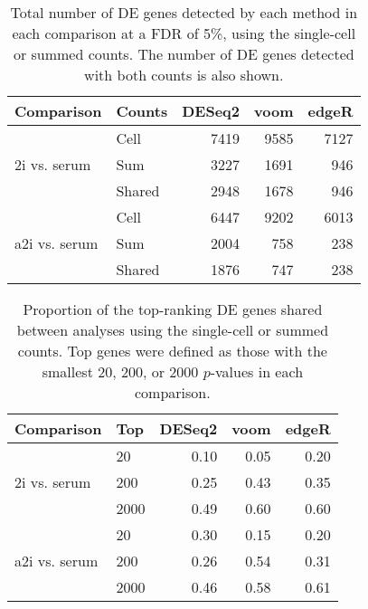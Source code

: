 \documentclass[oupdraft]{bio}
\begin{document}
\begin{table}[!p]
\caption{Total number of DE genes detected by each method in each comparison at a FDR of 5\%, using the single-cell or summed counts.
The number of DE genes detected with both counts is also shown.
}
\label{tab:realnum}
\begin{center}
\begin{tabular}{l l r r r}
\hline
\textbf{Comparison} & \textbf{Counts} & \textbf{DESeq2} & \textbf{voom} & \textbf{edgeR} \\
\hline
\multirow{3}{*}{2i vs. serum} 
& Cell & 7419 & 9585 & 7127 \\
& Sum & 3227 & 1691 & 946 \\
& Shared & 2948 & 1678 & 946 \\
\hline
\multirow{3}{*}{a2i vs. serum} 
& Cell & 6447 & 9202 & 6013 \\
& Sum & 2004 & 758 & 238 \\
& Shared & 1876 & 747 & 238 \\
\hline
\end{tabular}
\end{center}
\end{table}

\begin{table}[!p]
\caption{Proportion of the top-ranking DE genes shared between analyses using the single-cell or summed counts.
Top genes were defined as those with the smallest 20, 200, or 2000 $p$-values in each comparison.
}
\label{tab:realrank}
\begin{center}
\begin{tabular}{l l r r r}
\hline
\textbf{Comparison} & \textbf{Top} & \textbf{DESeq2} & \textbf{voom} & \textbf{edgeR} \\
\hline
\multirow{3}{*}{2i vs. serum} 
& 20 & 0.10 & 0.05 & 0.20 \\
& 200 & 0.25 & 0.43 & 0.35 \\
& 2000 & 0.49 & 0.60 & 0.60 \\
\hline
\multirow{3}{*}{a2i vs. serum} 
& 20 & 0.30 & 0.15 & 0.20 \\
& 200 & 0.26 & 0.54 & 0.31 \\
& 2000 & 0.46 & 0.58 & 0.61 \\
\hline
\end{tabular}
\end{center}
\end{table}
\end{document}
